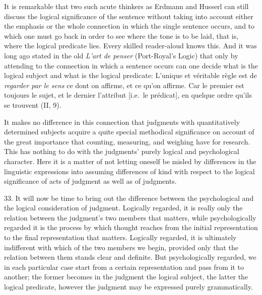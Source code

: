\documentclass[12pt,a4paper]{book}
\newcommand{\opage}[1]{\marginnote{\footnotesize\textit{[#1]}}}
\begin{document}
It is remarkable that two such acute thinkers as Erdmann and Husserl can
still discuss the logical significance of the sentence without taking into
account either the emphasis or the whole connection in which the single
sentence occurs, and to which one must go back in order to see where the
tone is to be laid, that is, where the logical predicate lies. Every
skilled reader-aloud knows this. And it was long ago stated in the old
\emph{L'art de penser} (Port-Royal's Logic) that only by attending to the
connection in which a sentence occurs can one decide what is \opage{91}the logical
subject and what is the logical predicate: L'unique et véritable règle est
de \emph{regarder par le sens} ce dont on affirme, et ce qu'on affirme.
Car le premier est toujours le sujet, et le dernier l'attribut [i.e.\ le
prédicat], en quelque ordre qu'ils se trouvent (II, 9).

It makes no difference in this connection that judgments with
quantitatively determined subjects acquire a quite special methodical
significance on account of the great importance that counting, measuring,
and weighing have for research. This has nothing to do with the judgments'
purely logical and psychological character. Here it is a matter of not
letting oneself be misled by differences in the linguistic expressions
into assuming differences of kind with respect to the logical significance
of acts of judgment as well as of judgments.

33. It will now be time to bring out the difference between the
psychological and the logical consideration of judgment. Logically
regarded, it is really only the relation between the judgment's two
members that matters, while psychologically regarded it is the process by
which thought reaches from the initial representation to the final
representation that matters. Logically regarded, it is ultimately
indifferent with which of the two members we begin, provided only that the
relation between them stands clear and definite. But psychologically
regarded, we in each particular case start from a certain representation
and pass from it to another; the former becomes in the judgment the
logical subject, the latter the logical predicate, however the judgment
may be expressed purely grammatically.
\end{document}
